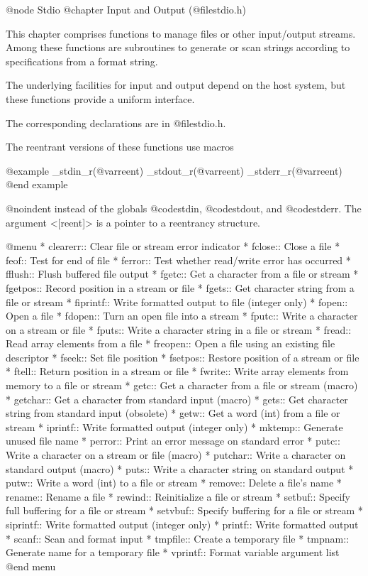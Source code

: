 @node Stdio
@chapter Input and Output (@file{stdio.h}) 

This chapter comprises functions to manage files
or other input/output streams. Among these functions are subroutines
to generate or scan strings according to specifications from a format string. 

The underlying facilities for input and output depend on the host
system, but these functions provide a uniform interface.

The corresponding declarations are in @file{stdio.h}.

The reentrant versions of these functions use macros

@example
_stdin_r(@var{reent})
_stdout_r(@var{reent})
_stderr_r(@var{reent})
@end example

@noindent
instead of the globals @code{stdin}, @code{stdout}, and
@code{stderr}.  The argument <[reent]> is a pointer to a reentrancy
structure.
 
@menu  
* clearerr::    Clear file or stream error indicator
* fclose::      Close a file
* feof::        Test for end of file
* ferror::      Test whether read/write error has occurred
* fflush::      Flush buffered file output
* fgetc::       Get a character from a file or stream
* fgetpos::     Record position in a stream or file
* fgets::       Get character string from a file or stream
* fiprintf::    Write formatted output to file (integer only)
* fopen::       Open a file
* fdopen::	Turn an open file into a stream
* fputc::       Write a character on a stream or file
* fputs::       Write a character string in a file or stream
* fread::       Read array elements from a file
* freopen::     Open a file using an existing file descriptor
* fseek::       Set file position
* fsetpos::     Restore position of a stream or file
* ftell::       Return position in a stream or file
* fwrite::      Write array elements from memory to a file or stream
* getc::        Get a character from a file or stream (macro)
* getchar::     Get a character from standard input (macro)
* gets::        Get character string from standard input (obsolete)
* getw::        Get a word (int) from a file or stream
* iprintf::     Write formatted output (integer only)
* mktemp::      Generate unused file name
* perror::      Print an error message on standard error
* putc::        Write a character on a stream or file (macro)
* putchar::     Write a character on standard output (macro)
* puts::        Write a character string on standard output
* putw::        Write a word (int) to a file or stream
* remove::      Delete a file's name
* rename::      Rename a file
* rewind::      Reinitialize a file or stream
* setbuf::      Specify full buffering for a file or stream
* setvbuf::     Specify buffering for a file or stream
* siprintf::    Write formatted output (integer only)
* printf::      Write formatted output
* scanf::       Scan and format input
* tmpfile::     Create a temporary file
* tmpnam::      Generate name for a temporary file
* vprintf::     Format variable argument list
@end menu 

